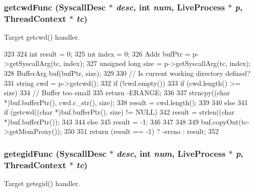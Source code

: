 \hypertarget{syscall__emul_8hh_ae2dad23a33eba280d86c2592fcd93fe9}{
\subsubsection[{getcwdFunc}]{ getcwdFunc ({\bf SyscallDesc} $\ast$ {\em desc}, \/  int {\em num}, \/  {\bf LiveProcess} $\ast$ {\em p}, \/  {\bf ThreadContext} $\ast$ {\em tc})}}
\label{syscall__emul_8hh_ae2dad23a33eba280d86c2592fcd93fe9}


Target getcwd() handler. 


\begin{DoxyCode}
323 {
324     int result = 0;
325     int index = 0;
326     Addr bufPtr = p->getSyscallArg(tc, index);
327     unsigned long size = p->getSyscallArg(tc, index);
328     BufferArg buf(bufPtr, size);
329 
330     // Is current working directory defined?
331     string cwd = p->getcwd();
332     if (!cwd.empty()) {
333         if (cwd.length() >= size) {
334             // Buffer too small
335             return -ERANGE;
336         }
337         strncpy((char *)buf.bufferPtr(), cwd.c_str(), size);
338         result = cwd.length();
339     }
340     else {
341         if (getcwd((char *)buf.bufferPtr(), size) != NULL) {
342             result = strlen((char *)buf.bufferPtr());
343         }
344         else {
345             result = -1;
346         }
347     }
348 
349     buf.copyOut(tc->getMemProxy());
350 
351     return (result == -1) ? -errno : result;
352 }
\end{DoxyCode}
\hypertarget{syscall__emul_8hh_ae1874a907c0abc563157b5e6cca909f4}{
\subsubsection[{getegidFunc}]{ getegidFunc ({\bf SyscallDesc} $\ast$ {\em desc}, \/  int {\em num}, \/  {\bf LiveProcess} $\ast$ {\em p}, \/  {\bf ThreadContext} $\ast$ {\em tc})}}
\label{syscall__emul_8hh_ae1874a907c0abc563157b5e6cca909f4}


Target getegid() handler. 


